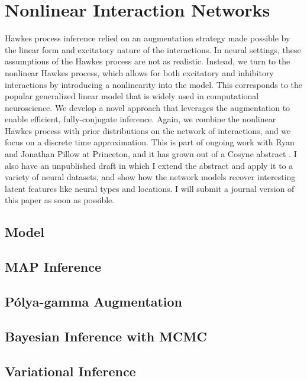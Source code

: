 
\chapter{Nonlinear Interaction Networks}



Hawkes process inference relied on an augmentation strategy 
made possible by the linear form and excitatory nature 
 of the interactions. In neural settings, these assumptions 
of the Hawkes process are not as realistic. Instead, we turn to 
the nonlinear Hawkes process, which allows for both excitatory 
and inhibitory interactions by introducing a nonlinearity 
into the model. This corresponds to the popular generalized 
linear model that is widely used in computational neuroscience. 
We develop a novel approach that leverages the 
\polyagamma augmentation to enable efficient, fully-conjugate 
inference. Again, we combine the nonlinear Hawkes process with 
prior distributions on the network of interactions, and we focus 
on a discrete time approximation. This is part of ongoing work 
with Ryan and Jonathan Pillow at Princeton, and it has grown out 
of a Cosyne abstract \cite{linderman2015cosyne}. I also have an 
unpublished draft in which I extend the abstract and apply it 
to a variety of neural datasets, and show how the network models 
recover interesting latent features like neural types and locations.
I will submit a journal version of this paper as soon as possible.

\section{Model}

\section{MAP Inference}

\section{P\'{o}lya-gamma Augmentation}

\section{Bayesian Inference with MCMC}

\section{Variational Inference}

